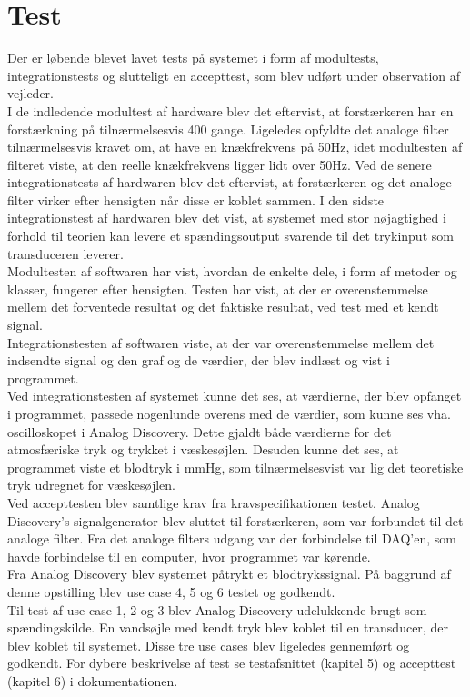 \section{Test}
Der er løbende blevet lavet tests på systemet i form af  modultests, integrationstests og slutteligt en accepttest, som blev udført under observation af vejleder.\\ 
I de indledende modultest af hardware blev det eftervist, at forstærkeren har en forstærkning på tilnærmelsesvis 400 gange. Ligeledes opfyldte det analoge filter tilnærmelsesvis kravet om, at have en knækfrekvens på 50Hz, idet modultesten af filteret viste, at den reelle knækfrekvens ligger lidt over 50Hz. Ved de senere integrationstests af hardwaren blev det eftervist, at forstærkeren og det analoge filter virker efter hensigten når disse er koblet sammen. I den sidste integrationstest af hardwaren blev det vist, at systemet med stor nøjagtighed i forhold til teorien kan levere et spændingsoutput svarende til det trykinput som transduceren leverer.\\[2ex]
Modultesten af softwaren har vist, hvordan de enkelte dele, i form af metoder og klasser, fungerer efter hensigten. Testen har vist, at der er overenstemmelse mellem det forventede resultat og det faktiske resultat, ved test med et kendt signal. \\
Integrationstesten af softwaren viste, at der var overenstemmelse mellem det indsendte signal og den graf og de værdier, der blev indlæst og vist i programmet.\\[1ex]
Ved integrationstesten af systemet kunne det ses, at værdierne, der blev opfanget i programmet, passede nogenlunde overens med de værdier, som kunne ses vha. oscilloskopet i Analog Discovery. Dette gjaldt både værdierne for det atmosfæriske tryk og trykket i væskesøjlen. Desuden kunne det ses, at programmet viste et blodtryk i mmHg, som tilnærmelsesvist var lig det teoretiske tryk udregnet for væskesøjlen. \\[2ex]
Ved accepttesten blev samtlige krav fra kravspecifikationen testet. Analog Discovery's signalgenerator blev sluttet til forstærkeren, som var forbundet til det analoge filter. Fra det analoge filters udgang var der forbindelse til DAQ'en, som havde forbindelse til en computer, hvor programmet var kørende.\\
Fra Analog Discovery blev systemet påtrykt et blodtrykssignal. På baggrund af denne opstilling blev use case 4, 5 og 6 testet og godkendt.\\
Til test af use case 1, 2 og 3 blev Analog Discovery udelukkende brugt som spændingskilde. En vandsøjle med kendt tryk blev koblet til en transducer, der blev koblet til systemet. Disse tre use cases blev ligeledes gennemført og godkendt. For dybere beskrivelse af test se testafsnittet (kapitel 5) og accepttest (kapitel 6) i dokumentationen.

